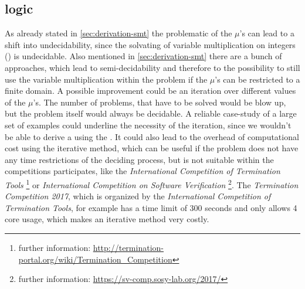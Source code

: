 \subsection{\solver logic}
As already stated in \autoref{sec:derivation-smt} the problematic of the $\mu$'s can lead to a shift into undecidability, since the solvating of variable multiplication on integers (\qfnia) is undecidable. Also mentioned in \autoref{sec:derivation-smt} there are a bunch of approaches, which lead to semi-decidability and therefore to the possibility to still use the variable multiplication within the problem if the $\mu$'s can be restricted to a finite domain.\newline
A possible improvement could be an iteration over different values of the $\mu$'s. The number of problems, that have to be solved would be blow up, but the problem itself would always be decidable.\newline
A reliable case-study of a large set of examples could underline the necessity of the iteration, since we wouldn't be able to derive a \gna using the \qfnia. It could also lead to the overhead of computational cost using the iterative method, which can be useful if the problem does not have any time restrictions of the deciding process, but is not suitable within the competitions \aprove participates, like the \textit{International Competition of Termination Tools} \footnote{ further information: \url{http://termination-portal.org/wiki/Termination_Competition} } or \textit{International Competition on Software Verification} \footnote{further information: \url{https://sv-comp.sosy-lab.org/2017/}}. \cite{aproveWebsite} \newline
The \textit{Termination Competition 2017}, which is organized by the \textit{International Competition of Termination Tools}, for example has a time limit of 300 seconds and only allows 4 core usage, which makes an iterative method very costly. \cite{wiki2017termComp}

